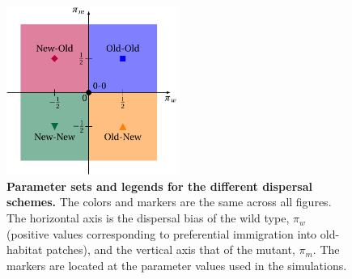 \documentclass[a4paper,11pt]{article}
\begin{document}
\begin{figure}[t]
	\centering
	\includegraphics[width=0.5\textwidth]{fig1.pdf}
	\caption{\textbf{Parameter sets and legends for the different dispersal schemes.} \small The colors and markers are the same across all figures. The horizontal axis is the dispersal bias of the wild type, $\pi_w$ (positive values corresponding to preferential immigration into old-habitat patches), and the vertical axis that of the mutant, $\pi_m$. The markers are located at the parameter values used in the simulations.
		}
	\label{fig:disp_schemes}
\end{figure}
\end{document}
